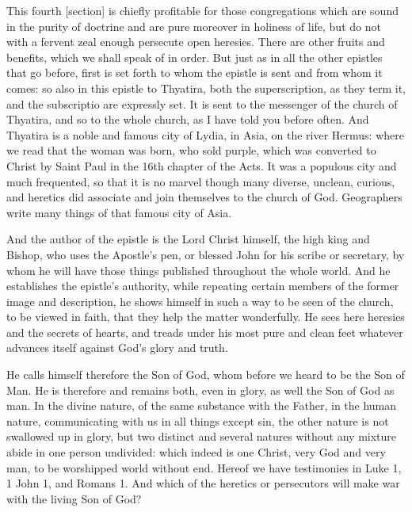 This fourth [section] is chiefly profitable for those congregations which are sound in the purity of doctrine and are pure moreover in holiness of life, but do not with a fervent zeal enough persecute open heresies. There are other fruits and benefits, which we shall speak of in order. But just as in all the other epistles that go before, first is set forth to whom the epistle is sent and from whom it comes: so also in this epistle to Thyatira, both the superscription, as they term it, and the subscriptio are expressly set. It is sent to the messenger of the church of Thyatira, and so to the whole church, as I have told you before often. And Thyatira is a noble and famous city of Lydia, in Asia, on the river Hermus: where we read that the woman was born, who sold purple, which was converted to Christ by Saint Paul in the 16th chapter of the Acts. It was a populous city and much frequented, so that it is no marvel though many diverse, unclean, curious, and heretics did associate and join themselves to the church of God. Geographers write many things of that famous city of Asia.

And the author of the epistle is the Lord Christ himself, the high king and Bishop, who uses the Apostle’s pen, or blessed John for his scribe or secretary, by whom he will have those things published throughout the whole world. And he establishes the epistle’s authority, while repeating certain members of the former image and description, he shows himself in such a way to be seen of the church, to be viewed in faith, that they help the matter wonderfully. He sees here heresies and the secrets of hearts, and treads under his most pure and clean feet whatever advances itself against God’s glory and truth.

He calls himself therefore the Son of God, whom before we heard to be the Son of Man. He is therefore and remains both, even in glory, as well the Son of God as man. In the divine nature, of the same substance with the Father, in the human nature, communicating with us in all things except sin, the other nature is not swallowed up in glory, but two distinct and several natures without any mixture abide in one person undivided: which indeed is one Christ, very God and very man, to be worshipped world without end. Hereof we have testimonies in Luke 1, 1 John 1, and Romans 1. And which of the heretics or persecutors will make war with the living Son of God?

